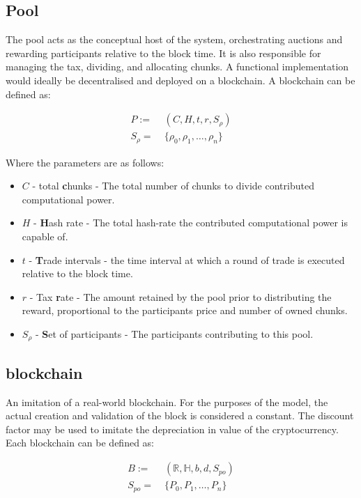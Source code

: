 \subsection{Pool}

The pool acts as the conceptual host of the system, orchestrating auctions and rewarding participants relative to the block time. It is also responsible for managing the tax, dividing, and allocating chunks. A functional implementation would ideally be decentralised and deployed on a blockchain. A blockchain can be defined as:

\begin{align}
    P :=&\; (C, H, t, r, S_\rho) \\
    S_\rho =&\; \{\rho_0, \rho_1, \ldots, \rho_n\}
\end{align}

\noindent Where the parameters are as follows:
\begin{itemize}
    \item $C$ - total \textbf{c}hunks - The total number of chunks to divide contributed computational power.
    \item $H$ - \textbf{H}ash rate - The total hash-rate the contributed computational power is capable of.
    \item $t$ - \textbf{T}rade intervals - the time interval at which a round of trade is executed relative to the block time.
    \item $r$ - Tax \textbf{r}ate - The amount retained by the pool prior to distributing the reward, proportional to the participants price and number of owned chunks.
    \item $S_\rho$ - \textbf{S}et of participants - The participants contributing to this pool.
\end{itemize}

\subsection{blockchain}

An imitation of a real-world blockchain. For the purposes of the model, the actual creation and validation of the block is considered a constant. The discount factor may be used to imitate the depreciation in value of the cryptocurrency. Each blockchain can be defined as:

\begin{align}
    B :=&\; (\mathbb{R}, \mathbb{H}, b, d, S_{po}) \\
    S_{po} =&\; \{P_0, P_1, \ldots, P_n\}
\end{align}

